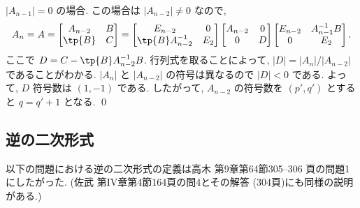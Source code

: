 \documentclass[12pt,twoside]{jarticle}
\begin{document}
$|A_{n-1}|=0$ の場合.  この場合は $|A_{n-2}|\ne 0$ なので,
\begin{equation*}
  A_n = 
  A =
  \begin{bmatrix}
    A_{n-2} & B \\
    \tp{B}  & C \\
  \end{bmatrix}
  =
  \begin{bmatrix}
    E_{n-2}            & 0 \\
    \tp{B}A_{n-2}^{-1} & E_2 \\
  \end{bmatrix}
  \begin{bmatrix}
    A_{n-2} & 0 \\
    0       & D \\
  \end{bmatrix}
  \begin{bmatrix}
    E_{n-2} & A_{n-1}^{-1}B \\
      0     & E_2 \\
  \end{bmatrix}.
\end{equation*}
ここで $D = C - \tp{B}A_{n-2}^{-1}B$.
行列式を取ることによって, $|D|=|A_n|/|A_{n-2}|$ であることがわかる.
$|A_n|$ と $|A_{n-2}|$ の符号は異なるので $|D|<0$ である.
よって, $D$ 符号数は $(1,-1)$ である.
したがって, $A_{n-2}$ の符号数を $(p',q')$ とすると $q=q'+1$ となる.
\qed


\subsection{逆の二次形式}

以下の問題における逆の二次形式の定義は高木 \cite{takagi1} 第9章第64節305--306
頁の問題1にしたがった.  (佐武 \cite{satake} 第IV章第4節164頁の問4とその解答
(304頁)にも同様の説明がある.)
\end{document}
